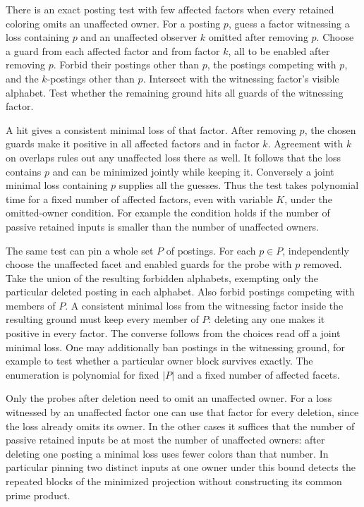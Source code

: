There is an exact posting test with few
affected factors when every retained
coloring omits an unaffected owner.
For a posting $p$, guess a factor
witnessing a loss containing $p$ and
an unaffected observer $k$ omitted
after removing $p$. Choose a guard
from each affected factor and from
factor $k$, all to be enabled after
removing $p$. Forbid their postings
other than $p$, the postings competing
with $p$, and the $k$-postings other
than $p$. Intersect with the witnessing
factor's visible alphabet. Test whether
the remaining ground hits all guards
of the witnessing factor.

A hit gives a consistent minimal loss
of that factor. After removing $p$,
the chosen guards make it positive in
all affected factors and in factor $k$.
Agreement with $k$ on overlaps rules
out any unaffected loss there as well.
It follows that the loss contains $p$
and can be minimized jointly while
keeping it. Conversely a joint minimal
loss containing $p$ supplies all the
guesses. Thus the test takes polynomial
time for a fixed number of affected
factors, even with variable $K$, under
the omitted-owner condition. For example
the condition holds if the number of
passive retained inputs is smaller
than the number of unaffected owners.

The same test can pin a whole set $P$ of
postings. For each $p\in P$, independently
choose the unaffected facet and enabled
guards for the probe with $p$ removed.
Take the union of the resulting forbidden
alphabets, exempting only the particular
deleted posting in each alphabet. Also
forbid postings competing with members
of $P$. A consistent minimal loss from
the witnessing factor inside the resulting
ground must keep every member of $P$:
deleting any one makes it positive in
every factor. The converse follows from
the choices read off a joint minimal
loss. One may additionally ban postings
in the witnessing ground, for example
to test whether a particular owner block
survives exactly. The enumeration is
polynomial for fixed $|P|$ and a fixed
number of affected facets.

Only the probes after deletion need
to omit an unaffected owner. For a
loss witnessed by an unaffected factor
one can use that factor for every
deletion, since the loss already omits
its owner. In the other cases it
suffices that the number of passive
retained inputs be at most the number
of unaffected owners: after deleting
one posting a minimal loss uses fewer
colors than that number. In particular
pinning two distinct inputs at one
owner under this bound detects the
repeated blocks of the minimized
projection without constructing its
common prime product.

